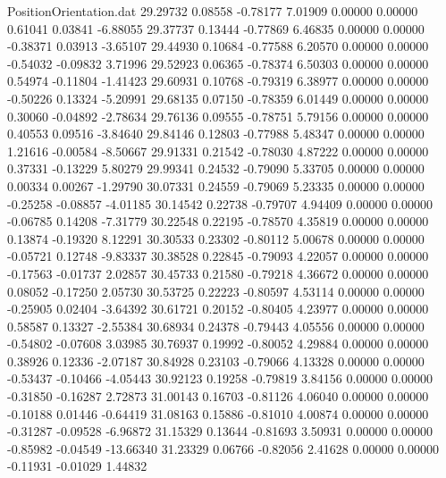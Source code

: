 \begin{filecontents}{PositionOrientation.dat}
  29.29732    0.08558   -0.78177     7.01909    0.00000    0.00000    0.61041    0.03841   -6.88055
  29.37737    0.13444   -0.77869     6.46835    0.00000    0.00000   -0.38371    0.03913   -3.65107
  29.44930    0.10684   -0.77588     6.20570    0.00000    0.00000   -0.54032   -0.09832    3.71996
  29.52923    0.06365   -0.78374     6.50303    0.00000    0.00000    0.54974   -0.11804   -1.41423
  29.60931    0.10768   -0.79319     6.38977    0.00000    0.00000   -0.50226    0.13324   -5.20991
  29.68135    0.07150   -0.78359     6.01449    0.00000    0.00000    0.30060   -0.04892   -2.78634
  29.76136    0.09555   -0.78751     5.79156    0.00000    0.00000    0.40553    0.09516   -3.84640
  29.84146    0.12803   -0.77988     5.48347    0.00000    0.00000    1.21616   -0.00584   -8.50667
  29.91331    0.21542   -0.78030     4.87222    0.00000    0.00000    0.37331   -0.13229    5.80279
  29.99341    0.24532   -0.79090     5.33705    0.00000    0.00000    0.00334    0.00267   -1.29790
  30.07331    0.24559   -0.79069     5.23335    0.00000    0.00000   -0.25258   -0.08857   -4.01185
  30.14542    0.22738   -0.79707     4.94409    0.00000    0.00000   -0.06785    0.14208   -7.31779
  30.22548    0.22195   -0.78570     4.35819    0.00000    0.00000    0.13874   -0.19320    8.12291
  30.30533    0.23302   -0.80112     5.00678    0.00000    0.00000   -0.05721    0.12748   -9.83337
  30.38528    0.22845   -0.79093     4.22057    0.00000    0.00000   -0.17563   -0.01737    2.02857
  30.45733    0.21580   -0.79218     4.36672    0.00000    0.00000    0.08052   -0.17250    2.05730
  30.53725    0.22223   -0.80597     4.53114    0.00000    0.00000   -0.25905    0.02404   -3.64392
  30.61721    0.20152   -0.80405     4.23977    0.00000    0.00000    0.58587    0.13327   -2.55384
  30.68934    0.24378   -0.79443     4.05556    0.00000    0.00000   -0.54802   -0.07608    3.03985
  30.76937    0.19992   -0.80052     4.29884    0.00000    0.00000    0.38926    0.12336   -2.07187
  30.84928    0.23103   -0.79066     4.13328    0.00000    0.00000   -0.53437   -0.10466   -4.05443
  30.92123    0.19258   -0.79819     3.84156    0.00000    0.00000   -0.31850   -0.16287    2.72873
  31.00143    0.16703   -0.81126     4.06040    0.00000    0.00000   -0.10188    0.01446   -0.64419
  31.08163    0.15886   -0.81010     4.00874    0.00000    0.00000   -0.31287   -0.09528   -6.96872
  31.15329    0.13644   -0.81693     3.50931    0.00000    0.00000   -0.85982   -0.04549  -13.66340
  31.23329    0.06766   -0.82056     2.41628    0.00000    0.00000   -0.11931   -0.01029    1.44832

\end{filecontents}
